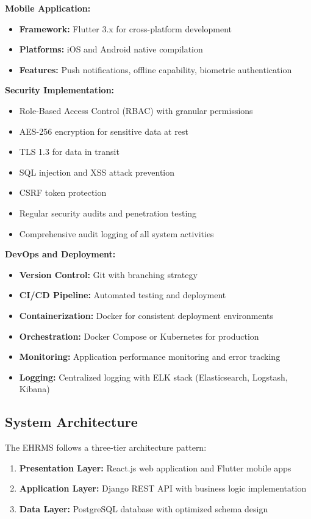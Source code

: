 \documentclass[12pt]{article}
\begin{document}
\textbf{Mobile Application:}
\begin{itemize}[noitemsep]
\item \textbf{Framework:} Flutter 3.x for cross-platform development
\item \textbf{Platforms:} iOS and Android native compilation
\item \textbf{Features:} Push notifications, offline capability, biometric authentication
\end{itemize}

\textbf{Security Implementation:}
\begin{itemize}[noitemsep]
\item Role-Based Access Control (RBAC) with granular permissions
\item AES-256 encryption for sensitive data at rest
\item TLS 1.3 for data in transit
\item SQL injection and XSS attack prevention
\item CSRF token protection
\item Regular security audits and penetration testing
\item Comprehensive audit logging of all system activities
\end{itemize}

\textbf{DevOps and Deployment:}
\begin{itemize}[noitemsep]
\item \textbf{Version Control:} Git with branching strategy
\item \textbf{CI/CD Pipeline:} Automated testing and deployment
\item \textbf{Containerization:} Docker for consistent deployment environments
\item \textbf{Orchestration:} Docker Compose or Kubernetes for production
\item \textbf{Monitoring:} Application performance monitoring and error tracking
\item \textbf{Logging:} Centralized logging with ELK stack (Elasticsearch, Logstash, Kibana)
\end{itemize}

\subsection{System Architecture}

The EHRMS follows a three-tier architecture pattern:

\begin{enumerate}[noitemsep]
\item \textbf{Presentation Layer:} React.js web application and Flutter mobile apps
\item \textbf{Application Layer:} Django REST API with business logic implementation
\item \textbf{Data Layer:} PostgreSQL database with optimized schema design
\end{enumerate}
\end{document}
